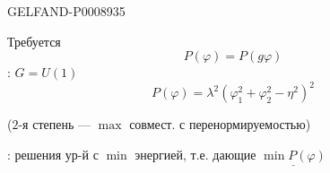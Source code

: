 \begin{GelfandAdjacentEvidence}{GELFAND-P000893}{5}


Требуется
\begin{equation*}
P(\varphi)=P(g\varphi) \tag{14}
\end{equation*}
: $G=U(1)$
\begin{equation*}
P(\varphi)=\lambda^2(\varphi_1^2+\varphi_2^2-\eta^2)^2 \tag{15}
\end{equation*}
\end{GelfandAdjacentEvidence}


($2$-я степень — $\max$ совмест. с перенормируемостью)

: решения ур-й с $\min$ энергией, т.е. дающие $\underline{\min P(\varphi)}$


